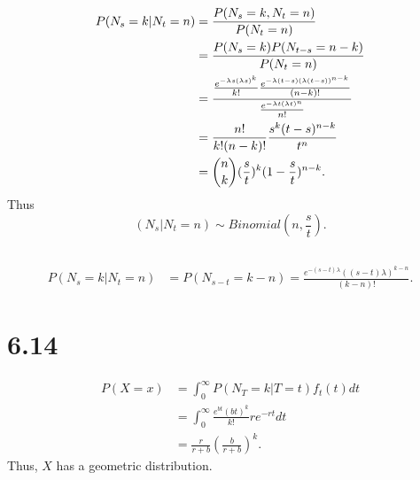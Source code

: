 \documentclass{article}
\begin{document}
\subsection{}
\begin{align*}
    P(N_s=k|N_t=n) &= \frac{P(N_s=k, N_t=n)}{P(N_t=n)} \\
    &=\frac{P(N_s=k)P(N_{t-s}=n-k)}{P(N_t=n)} \\
    &= \frac{\frac{e^{-\lambda s (\lambda s)^k}}{k!}\frac{e^{-\lambda (t-s) (\lambda (t-s))^{n-k}}}{(n-k)!}}{\frac{e^{-\lambda t (\lambda t)^n}}{n!}} \\
    &=\frac{n!}{k!(n-k)!}\frac{s^k (t-s)^{n-k}}{t^n} \\
    &=\dbinom{n}{k}(\frac{s}{t})^k (1-\frac{s}{t})^{n-k}.
\end{align*}
Thus
\begin{equation*}
    (N_s|N_t=n) \sim Binomial(n, \frac{s}{t}).
\end{equation*}
\subsection{}
\begin{align*}
    P(N_s=k|N_t=n) &= P(N_{s-t}=k-n) = \frac{e^{-(s-t)\lambda}((s-t)\lambda)^{k-n}}{(k-n)!}.
\end{align*}

\section{6.14}
\begin{align*}
    P(X=x) &= \int_0^\infty P(N_T=k|T=t)f_t(t)dt \\
    &= \int_0^\infty \frac{e^{bt}(bt)^k}{k!}re^{-rt}dt \\
    &= \frac{r}{r+b}(\frac{b}{r+b})^k.
\end{align*}
Thus, $X$ has a geometric distribution. 
\end{document}

